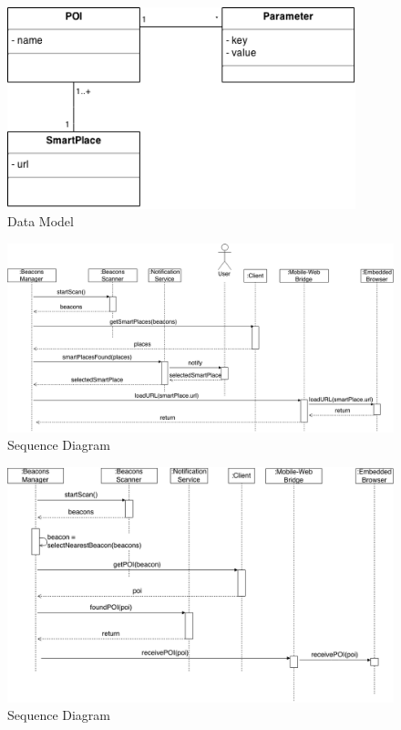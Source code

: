 \begin{figure}[!ht]
  \centering
    \includegraphics[width=0.9\textwidth]{img/smart-places-uml}
    \caption{Data Model}
    \label{fig:uml}
\end{figure}

\begin{figure}[!ht]
  \centering
    \includegraphics[width=1\textwidth]{img/smart-places-sequence}
    \caption{Sequence Diagram}
    \label{fig:sequence}
\end{figure}

\begin{figure}[!ht]
  \centering
    \includegraphics[width=1\textwidth]{img/smart-places-poi-sequence}
    \caption{Sequence Diagram}
    \label{fig:sequence-poi}
\end{figure}
